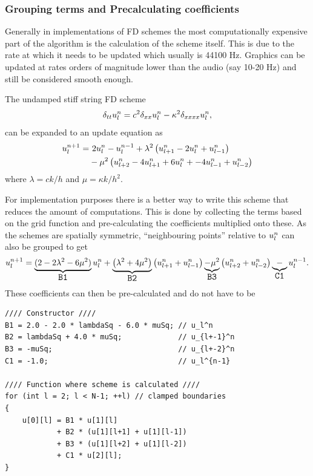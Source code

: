 \pagebreak
\subsubsection{Grouping terms and Precalculating coefficients}
Generally in implementations of FD schemes the most computationally expensive part of the algorithm is the calculation of the scheme itself. This is due to the rate at which it needs to be updated which usually is 44100 Hz. Graphics can be updated at rates orders of magnitude lower than the audio (say 10-20 Hz) and still be considered smooth enough.

The undamped stiff string FD scheme%
\begin{equation}
    \delta_{tt} u_l^n = c^2 \delta_{xx} u_l^n - \kappa^2 \delta_{xxxx} u_l^n,
\end{equation}
can be expanded to an update equation as
\begin{equation}
    \begin{aligned}
        u_l^{n+1} = &\ 2u_l^n - u_l^{n-1} + \lambda^2 \left(u_{l+1}^n - 2u_l^n + u_{l-1}^n\right)\\
        & - \mu^2 \left(u_{l+2}^n - 4u_{l+1}^n + 6u_l^n + -4u_{l-1}^n + u_{l-2}^n\right)
    \end{aligned}
\end{equation}
where $\lambda = ck/h$ and $\mu = \kappa k / h^2$.

For implementation purposes there is a better way to write this scheme that reduces the amount of computations. This is done by collecting the terms based on the grid function and pre-calculating the coefficients multiplied onto these. As the schemes are spatially symmetric, ``neighbouring points'' relative to $u_l^n$ can also be grouped to get
\def\semilarge{\fontsize{11}{11.6}\selectfont}
\begin{equation}
    u_l^{n+1} = \underbrace{(2 - 2\lambda^2 - 6\mu^2)}_{\texttt{\semilarge B1}}\uln  + \underbrace{\left(\lambda^2 + 4\mu^2\right)}_{\texttt{\semilarge B2}}\left(u_{l+1}^n+u_{l-1}^n\right)\underbrace{-\mu^2}_{\texttt{\semilarge B3}} \left(u_{l+2}^n+u_{l-2}^n\right) \underbrace{-}_{\texttt{\semilarge C1}} u_l^{n-1}.
\end{equation}
These coefficients can then be pre-calculated and do not have to be 

\begin{lstlisting}[caption=Precalculation]
//// Constructor ////
B1 = 2.0 - 2.0 * lambdaSq - 6.0 * muSq; // u_l^n
B2 = lambdaSq + 4.0 * muSq;             // u_{l+-1}^n
B3 = -muSq;                             // u_{l+-2}^n
C1 = -1.0;                              // u_l^{n-1}

//// Function where scheme is calculated ////
for (int l = 2; l < N-1; ++l) // clamped boundaries
{
    u[0][l] = B1 * u[1][l]
            + B2 * (u[1][l+1] + u[1][l-1]) 
            + B3 * (u[1][l+2] + u[1][l-2])
            + C1 * u[2][l];
}
\end{lstlisting}

